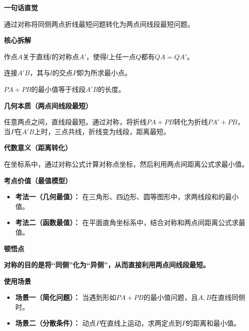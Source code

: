 \begin{explanationbox}
	\textbf{\textcolor{CExplanation}{一句话直觉}}

	通过对称将同侧两点折线最短问题转化为两点间线段最短问题。

	\medskip
	\textbf{\textcolor{CExplanation}{核心拆解}}
	\begin{description}[style=nextline, leftmargin=2.8em, labelsep=0.5em, itemsep=0.45em]
		\item[\textbf{要点一（对称转化）：}] 作点$A$关于直线$l$的对称点$A'$，使得$l$上任一点$Q$都有$QA=QA'$。
		\item[\textbf{要点二（连接求交）：}] 连接$A'B$，其与$l$的交点$P$即为所求最小点。
		\item[\textbf{要点三（最小距离）：}] $PA+PB$的最小值等于线段$A'B$的长度。
	\end{description}

	\medskip
	\textbf{\textcolor{CExplanation}{几何本质（两点间线段最短）}}

	任意两点之间，直线段最短。通过对称，将折线$PA+PB$转化为折线$PA'+PB$，当$P$在$A'B$上时，三点共线，折线变为线段，距离最短。

	\medskip
	\textbf{\textcolor{CExplanation}{代数意义（距离转化）}}

	在坐标系中，通过对称公式计算对称点坐标，然后利用两点间距离公式求最小值。

	\medskip
	\textbf{\textcolor{CExplanation}{考点价值（最值模型）}}
	\begin{itemize}[leftmargin=*, itemsep=0.5em, topsep=0.4em]
		\item \textbf{考法一（几何最值）：} 在三角形、四边形、圆等图形中，求两线段和的最小值。
		\item \textbf{考法二（函数最值）：} 在平面直角坐标系中，结合对称和两点间距离公式求最值。
	\end{itemize}

	\medskip
	\textbf{\textcolor{CExplanation}{顿悟点}}

	\textbf{对称的目的是将“同侧”化为“异侧”，从而直接利用两点间线段最短。}

	\medskip
	\textbf{\textcolor{CExplanation}{使用场景}}
	\begin{itemize}[leftmargin=*, itemsep=0.5em, topsep=0.4em]
		\item \textbf{场景一（简化问题）：} 当遇到形如$PA+PB$的最小值问题，且$A,B$在直线同侧时。
		\item \textbf{场景二（分散条件）：} 动点$P$在直线上运动，求两定点到$P$的距离和最小值。
	\end{itemize}
\end{explanationbox}

